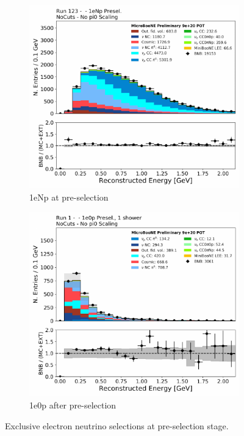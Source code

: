 \begin{figure}[H] 
\begin{center}
    \begin{subfigure}[b]{0.45\textwidth}
    \centering
    \includegraphics[width=1.00\textwidth]{Fakedata/set5/Np_presel_recoe.pdf}
    \caption{\label{fig:fakedata:set5:Np_presel_recoe} 1eNp at pre-selection}
    \end{subfigure}
    \begin{subfigure}[b]{0.45\textwidth}
    \centering
    \includegraphics[width=1.00\textwidth]{Fakedata/set5/zp_presel_recoe.pdf}
    \caption{\label{fig:fakedata:set5:2shr0p} 1e0p after pre-selection}
    \end{subfigure}
\caption{\label{fig:fakedata:set5:presel} Exclusive electron neutrino selections at pre-selection stage.}
\end{center}
\end{figure}

